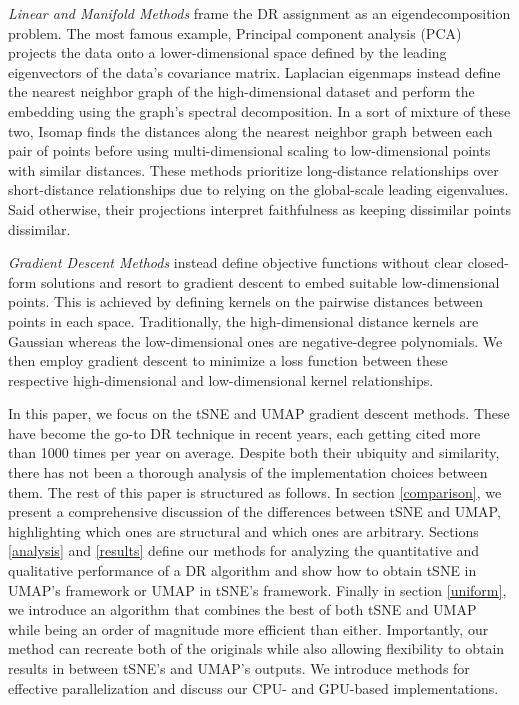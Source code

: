 \documentclass{article}
\theoremstyle{definition}
\begin{document}
\begin{multicols}{2}
\textit{Linear and Manifold Methods} frame the DR assignment as an eigendecomposition problem. The most famous example, Principal component analysis (PCA) projects the
data onto a lower-dimensional space defined by the leading eigenvectors of the data's covariance matrix. Laplacian eigenmaps \cite{belkin2003laplacian} instead define the nearest neighbor
graph of the high-dimensional dataset and perform the embedding using the graph's spectral decomposition. In a sort of mixture of these two, Isomap \cite{tenenbaum2000global} finds the
distances along the nearest neighbor graph between each pair of points before using multi-dimensional scaling to low-dimensional points with similar distances.
These methods prioritize long-distance relationships over short-distance relationships due to relying on the global-scale leading eigenvalues. Said
otherwise, their projections interpret faithfulness as keeping dissimilar points dissimilar.

\textit{Gradient Descent Methods} instead define objective functions without clear closed-form solutions and resort to gradient descent to embed
suitable low-dimensional points. This is achieved by defining kernels on the pairwise distances between points in each space. Traditionally, the
high-dimensional distance kernels are Gaussian whereas the low-dimensional ones are negative-degree polynomials. We then employ gradient descent to minimize
a loss function between these respective high-dimensional and low-dimensional kernel relationships.

In this paper, we focus on the tSNE \cite{van2008visualizing} and UMAP \cite{mcinnes2018umap} gradient descent methods. These have become the go-to DR technique in recent years, each getting cited more than
1000 times per year on average. Despite both their ubiquity and similarity, there has not been a thorough analysis of the implementation choices between them. The rest of this paper is structured as follows. In section \ref{comparison}, we present a comprehensive discussion of the
differences between tSNE and UMAP, highlighting which ones are structural and which ones are arbitrary. Sections \ref{analysis} and \ref{results} define our methods for
analyzing the quantitative and qualitative performance of a DR algorithm and show how to obtain tSNE in UMAP's framework or UMAP in tSNE's framework. Finally in
section \ref{uniform}, we introduce an algorithm that combines the best of both tSNE and UMAP while being an order of magnitude more efficient than either.
Importantly, our method can recreate both of the originals while also allowing flexibility to obtain results in between tSNE's and UMAP's outputs. We introduce
methods for effective parallelization and discuss our CPU- and GPU-based implementations.


\end{multicols}
\end{document}
